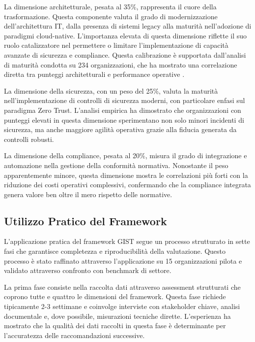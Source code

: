 La dimensione architetturale, pesata al 35\%, rappresenta il cuore della trasformazione. Questa componente valuta il grado di modernizzazione dell'architettura IT, dalla presenza di sistemi legacy alla maturità nell'adozione di paradigmi cloud-native. L'importanza elevata di questa dimensione riflette il suo ruolo catalizzatore nel permettere o limitare l'implementazione di capacità avanzate di sicurezza e compliance. Questa calibrazione è supportata dall'analisi di maturità condotta su 234 organizzazioni, che ha mostrato una correlazione diretta tra punteggi architetturali e performance operative \autocite{forrester2024maturity}.

La dimensione della sicurezza, con un peso del 25\%, valuta la maturità nell'implementazione di controlli di sicurezza moderni, con particolare enfasi sul paradigma Zero Trust. L'analisi empirica ha dimostrato che organizzazioni con punteggi elevati in questa dimensione sperimentano non solo minori incidenti di sicurezza, ma anche maggiore agilità operativa grazie alla fiducia generata da controlli robusti.

La dimensione della compliance, pesata al 20\%, misura il grado di integrazione e automazione nella gestione della conformità normativa. Nonostante il peso apparentemente minore, questa dimensione mostra le correlazioni più forti con la riduzione dei costi operativi complessivi, confermando che la compliance integrata genera valore ben oltre il mero rispetto delle normative.

\subsection{Utilizzo Pratico del Framework}

L'applicazione pratica del framework GIST segue un processo strutturato in sette fasi che garantisce completezza e riproducibilità della valutazione. Questo processo è stato raffinato attraverso l'applicazione su 15 organizzazioni pilota e validato attraverso confronto con benchmark di settore.

La prima fase consiste nella raccolta dati attraverso assessment strutturati che coprono tutte e quattro le dimensioni del framework. Questa fase richiede tipicamente 2-3 settimane e coinvolge interviste con stakeholder chiave, analisi documentale e, dove possibile, misurazioni tecniche dirette. L'esperienza ha mostrato che la qualità dei dati raccolti in questa fase è determinante per l'accuratezza delle raccomandazioni successive.

